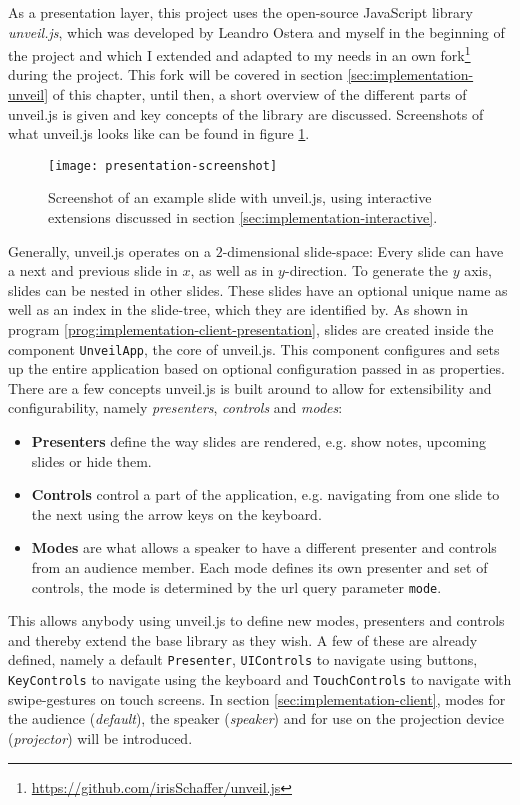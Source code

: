 As a presentation layer, this project uses the open-source JavaScript library \textit{unveil.js}, which was developed by Leandro Ostera and myself in the beginning of the project and which I extended and adapted to my needs in an own fork\footnote{\url{https://github.com/irisSchaffer/unveil.js}} during the project. This fork will be covered in section \ref{sec:implementation-unveil} of this chapter, until then, a short overview of the different parts of unveil.js is given and key concepts of the library are discussed. Screenshots of what unveil.js looks like can be found in figure \ref{fig:implementation-technologies-unveil-screenshots}.
%
\begin{figure}
\centering
\texttt{[image: presentation-screenshot]}
\caption{Screenshot of an example slide with unveil.js, using interactive extensions discussed in section \ref{sec:implementation-interactive}.}
\label{fig:implementation-technologies-unveil-screenshots}
\end{figure}
%
Generally, unveil.js operates on a $2$-dimensional slide-space: Every slide can have a next and previous slide in $x$, as well as in $y$-direction. To generate the $y$ axis, slides can be nested in other slides. These slides have an optional unique name as well as an index in the slide-tree, which they are identified by. As shown in program \ref{prog:implementation-client-presentation}, slides are created inside the component \texttt{UnveilApp}, the core of unveil.js. This component configures and sets up the entire application based on optional configuration passed in as properties.
There are a few concepts unveil.js is built around to allow for extensibility and configurability, namely \emph{presenters}, \emph{controls} and \emph{modes}:
%
\begin{itemize}
\item \textbf{Presenters} define the way slides are rendered, e.g. show notes, upcoming slides or hide them.
\item \textbf{Controls} control a part of the application, e.g. navigating from one slide to the next using the arrow keys on the keyboard.
\item \textbf{Modes} are what allows a speaker to have a different presenter and controls from an audience member. Each mode defines its own presenter and set of controls, the mode is determined by the url query parameter \texttt{mode}.
\end{itemize}
This allows anybody using unveil.js to define new modes, presenters and controls and thereby extend the base library as they wish. A few of these are already defined, namely a default \texttt{Presenter}, \texttt{UIControls} to navigate using buttons, \texttt{KeyControls} to navigate using the keyboard and \texttt{TouchControls} to navigate with swipe-gestures on touch screens. In section \ref{sec:implementation-client}, modes for the audience (\emph{default}), the speaker (\emph{speaker}) and for use on the projection device (\emph{projector}) will be introduced.

